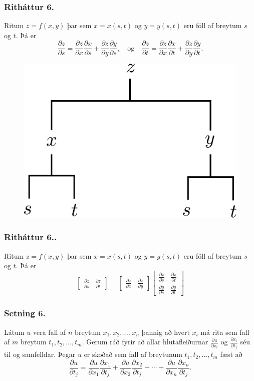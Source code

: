 \subsubsection{Ritháttur 6.}

Ritum $z=f(x,y)$ þar sem $x=x(s,t)$ og $y=y(s,t)$ eru föll af breytum $s$ og  $t$.  Þá er 
$$\frac{\partial z}{\partial s}=
\frac{\partial z}{\partial x}\frac{\partial x}{\partial s}
+\frac{\partial z}{\partial y}\frac{\partial y}{\partial s}, \quad \text{og}\quad \frac{\partial z}{\partial t}=
\frac{\partial z}{\partial x}\frac{\partial x}{\partial t}
+\frac{\partial z}{\partial y}\frac{\partial y}{\partial t}.$$

 \begin{figure}[h!]
           \centering
            \includegraphics[width=0.35\linewidth]{chain2}
    \end{figure}


\subsubsection{Ritháttur 6..}
 Ritum $z=f(x,y)$ þar sem $x=x(s,t)$ og $y=y(s,t)$ eru föll af breytum $s$ og  $t$.  Þá er 
$$\begin{bmatrix}\frac{\partial z}{\partial s} 
& \frac{\partial z}{\partial t}\end{bmatrix}
=\begin{bmatrix}\frac{\partial z}{\partial x} 
& \frac{\partial z}{\partial y}\end{bmatrix}
\begin{bmatrix}\frac{\partial x}{\partial s} 
& \frac{\partial x}{\partial t}\\
\frac{\partial y}{\partial s} 
& \frac{\partial y}{\partial t}
\end{bmatrix}$$

 

\subsubsection{Setning 6.}
Látum $u$ vera fall af $n$ breytum $x_1, x_2, \ldots, x_n$ þannig að hvert $x_i$ má rita sem fall af $m$ breytum $t_1, t_2, \ldots, t_m$.  Gerum ráð fyrir að allar hlutafleiðurnar $\frac{\partial u}{\partial x_i}$ og $\frac{\partial x_i}{\partial t_j}$ séu til og samfelldar.  Þegar $u$ er skoðað sem fall af breytunum $t_1, t_2, \ldots, t_m$ fæst að 
$$\frac{\partial u}{\partial t_j}=
\frac{\partial u}{\partial x_1}\frac{\partial x_1}{\partial t_j}
+\frac{\partial u}{\partial x_2}\frac{\partial x_2}{\partial t_j}
+\cdots+
\frac{\partial u}{\partial x_n}\frac{\partial x_n}{\partial t_j}.$$

